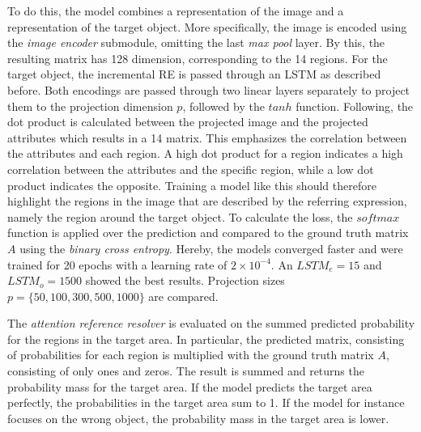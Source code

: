 To do this, the model combines a representation of the image and a representation of the target object.
More specifically, the image is encoded using the \emph{image encoder} submodule, omitting the last \emph{max pool} layer.
By this, the resulting matrix has 128 dimension, corresponding to the 14 regions.
For the target object, the incremental RE is passed through an LSTM as described before.
Both encodings are passed through two linear layers separately to project them to the projection dimension $p$, followed by the $tanh$ function.
Following, the dot product is calculated between the projected image and the projected attributes which results in a 14 matrix.
This emphasizes the correlation between the attributes and each region.
A high dot product for a region indicates a high correlation between the attributes and the specific region, while a low dot product indicates the opposite.
Training a model like this should therefore highlight the regions in the image that are described by the referring expression, namely the region around the target object.
To calculate the loss, the $softmax$ function is applied over the prediction and compared to the ground truth matrix $A$ using the \emph{binary cross entropy}.
Hereby, the models converged faster and were trained for 20 epochs with a learning rate of $2\times10^{-4}$.
An $LSTM_e=15$ and $LSTM_o=1500$ showed the best results.
Projection sizes $p=\{50,100,300,500,1000\}$ are compared.

The \emph{attention reference resolver} is evaluated on the summed predicted probability for the regions in the target area.
In particular, the predicted matrix, consisting of probabilities for each region is multiplied with the ground truth matrix $A$, consisting of only ones and zeros.
The result is summed and returns the probability mass for the target area.
If the model predicts the target area perfectly, the probabilities in the target area sum to 1.
If the model for instance focuses on the wrong object, the probability mass in the target area is lower.

